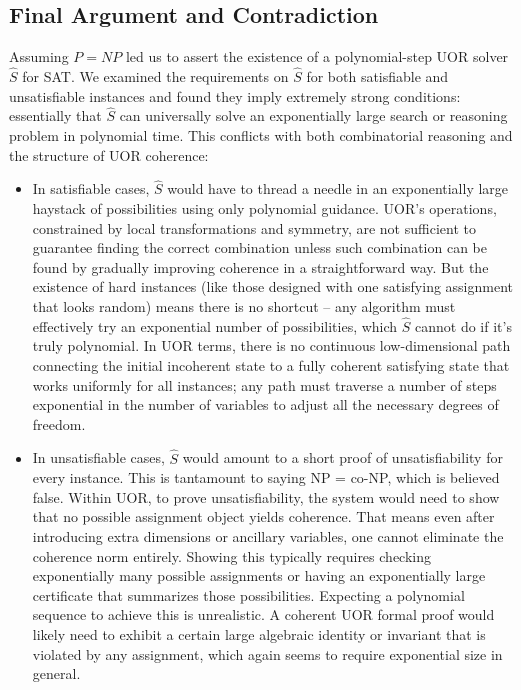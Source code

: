 \documentclass[11pt]{article}
\begin{document}
\subsection{Final Argument and Contradiction}
Assuming \(P=NP\) led us to assert the existence of a polynomial-step UOR solver \(\hat{S}\) for SAT. We examined the requirements on \(\hat{S}\) for both satisfiable and unsatisfiable instances and found they imply extremely strong conditions: essentially that \(\hat{S}\) can universally solve an exponentially large search or reasoning problem in polynomial time. This conflicts with both combinatorial reasoning and the structure of UOR coherence:
\begin{itemize}
    \item In satisfiable cases, \(\hat{S}\) would have to thread a needle in an exponentially large haystack of possibilities using only polynomial guidance. UOR’s operations, constrained by local transformations and symmetry, are not sufficient to guarantee finding the correct combination unless such combination can be found by gradually improving coherence in a straightforward way. But the existence of hard instances (like those designed with one satisfying assignment that looks random) means there is no shortcut -- any algorithm must effectively try an exponential number of possibilities, which \(\hat{S}\) cannot do if it’s truly polynomial. In UOR terms, there is no continuous low-dimensional path connecting the initial incoherent state to a fully coherent satisfying state that works uniformly for all instances; any path must traverse a number of steps exponential in the number of variables to adjust all the necessary degrees of freedom.
    \item In unsatisfiable cases, \(\hat{S}\) would amount to a short proof of unsatisfiability for every instance. This is tantamount to saying NP = co-NP, which is believed false. Within UOR, to prove unsatisfiability, the system would need to show that no possible assignment object yields coherence. That means even after introducing extra dimensions or ancillary variables, one cannot eliminate the coherence norm entirely. Showing this typically requires checking exponentially many possible assignments or having an exponentially large certificate that summarizes those possibilities. Expecting a polynomial sequence to achieve this is unrealistic. A coherent UOR formal proof would likely need to exhibit a certain large algebraic identity or invariant that is violated by any assignment, which again seems to require exponential size in general.
\end{itemize}
\end{document}
